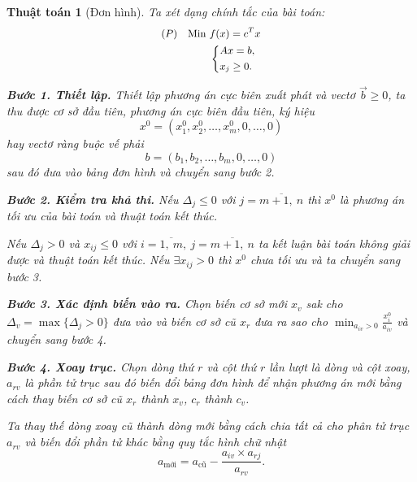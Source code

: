 \documentclass[12pt,a4paper]{report}
\newtheorem{ttoan}{Thuật toán}
\begin{document}
\begin{ttoan}[Đơn hình]
\setlength{\parindent}{4em}
Ta xét dạng chính tắc của bài toán:
    \begin{equation} \small \label{chinhtacdonhinhtt}
        \begin{split}
        (P) \quad \text{Min } & f(x) = c^Tx \\
            & \left\{
            \begin{split}
            & Ax=b, \\
            & x_j \geq 0.
            \end{split}
            \right.    
        \end{split}
    \end{equation}


\noindent \textbf{Bước 1. Thiết lập.}
Thiết lập phương án cực biên xuất phát và vectơ $\vec{b} \geq 0$, ta thu được cơ sở đầu tiên, phương án cực biên đầu tiên, ký hiệu
\begin{equation}
x^0=(x_1^0,x_2^0,\ldots,x_m^0,0,\ldots,0)
\end{equation}
hay vectơ ràng buộc vế phải
\begin{equation}
b=(b_1,b_2,\ldots,b_m,0,\ldots,0)
\end{equation}
sau đó đưa vào bảng đơn hình và chuyển sang bước 2.

\noindent \textbf{Bước 2. Kiểm tra khả thi.}
Nếu $\Delta _j\leq 0$ với $j=\overline{m+1, \: n}$ thì $x^0$ là phương án tối ưu của bài toán và thuật toán kết thúc. 

Nếu $\Delta _j > 0$ và $x_{ij}\leq 0$ với $i=\overline{1,\: m}, \: j=\overline{m+1, \: n}$ ta kết luận bài toán không giải được và thuật toán kết thúc. Nếu $\exists x_{ij} > 0$ thì $x^0$ chưa tối ưu và ta chuyển sang bước 3.

\noindent \textbf{Bước 3. Xác định biến vào ra.}
Chọn biến cơ sở mới $x_v$ sak cho $\Delta _v = \max \{\Delta _j >0 \}$ đưa vào và biến cơ sở cũ $x_r$ đưa ra sao cho $\min _{a_{iv}>0} \frac{x_i^0}{a_{iv}}$ và chuyển sang bước 4.

\noindent \textbf{Bước 4. Xoay trục.}
Chọn dòng thứ $r$ và cột thứ $r$ lần lượt là dòng và cột xoay, $a_{rv}$ là phần tử trục sau đó biến đổi bảng đơn hình để nhận phương án mới bằng cách thay biến cơ sở cũ $x_r$ thành $x_v$, $c_r$ thành $c_v$.

Ta thay thế dòng xoay cũ thành dòng mới bằng cách chia tất cả cho phân tử trục $a_{rv}$ và biến đổi phần tử khác bằng quy tắc hình chữ nhật
\begin{equation}
a_{\text{mới}} = a_{\text{cũ}} - \frac{a_{iv}\times a_{rj}}{a_{rv}}.
\end{equation}

\end{ttoan}
\end{document}
